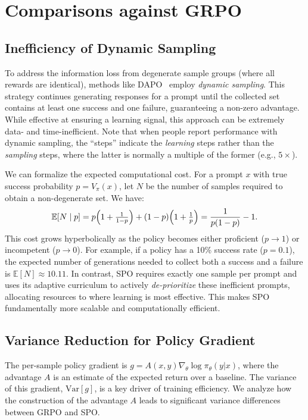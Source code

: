 \section{Comparisons against GRPO}\label{appendix:advanatages_over_GRPO}

\subsection{Inefficiency of Dynamic Sampling} 
To address the information loss from degenerate sample groups (where all rewards are identical), methods like DAPO~\cite{DAPO} employ \textit{dynamic sampling}. This strategy continues generating responses for a prompt until the collected set contains at least one success and one failure, guaranteeing a non-zero advantage. While effective at ensuring a learning signal, this approach can be extremely data- and time-inefficient. Note that when people report performance with dynamic sampling, the ``steps'' indicate the \emph{learning} steps rather than the \emph{sampling} steps, where the latter is normally a multiple of the former (e.g., $5\times$).

We can formalize the expected computational cost. For a prompt $x$ with true success probability $p = V_\pi(x)$, let $N$ be the number of samples required to obtain a non-degenerate set. We have:
\[
\mathbb{E}[N \mid p] 
= p\Bigl(1 + \tfrac{1}{1-p}\Bigr) + (1-p)\Bigl(1 + \tfrac{1}{p}\Bigr)
= \frac{1}{p(1-p)} - 1.
\]
This cost grows hyperbolically as the policy becomes either proficient ($p \to 1$) or incompetent ($p \to 0$). For example, if a policy has a 10\% success rate ($p=0.1$), the expected number of generations needed to collect both a success and a failure is $\mathbb{E}[N] \approx 10.11$. In contrast, SPO requires exactly one sample per prompt and uses its adaptive curriculum to actively \textit{de-prioritize} these inefficient prompts, allocating resources to where learning is most effective. This makes SPO fundamentally more scalable and computationally efficient.



\subsection{Variance Reduction for Policy Gradient}

The per-sample policy gradient is $g = A(x,y) \nabla_\theta \log \pi_\theta(y|x)$, where the advantage $A$ is an estimate of the expected return over a baseline. The variance of this gradient, $\mathrm{Var}[g]$, is a key driver of training efficiency. We analyze how the construction of the advantage $A$ leads to significant variance differences between GRPO and SPO.

